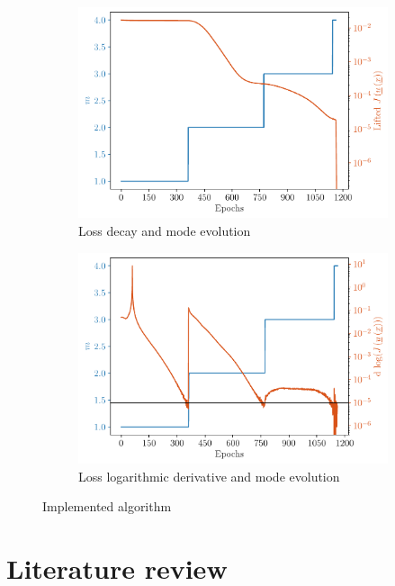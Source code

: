 \begin{figure}
	\begin{subfigure}[t]{0.5\linewidth}
		\centering
		\includegraphics[width=\linewidth]{Figures/Loss_Modes_Bi_800_Algo.pdf}
		\caption{Loss decay and mode evolution}
	\end{subfigure}
	\begin{subfigure}[t]{0.5\linewidth}
		\centering
		\includegraphics[width=\linewidth]{Figures/LossDecay_Modes_Bi_Algo.pdf}
		\caption{Loss logarithmic derivative and mode evolution}
	\end{subfigure}  
	\caption{Implemented algorithm}
	\label{fig:ImplementedAlgo}
\end{figure}

\section{Literature review}


